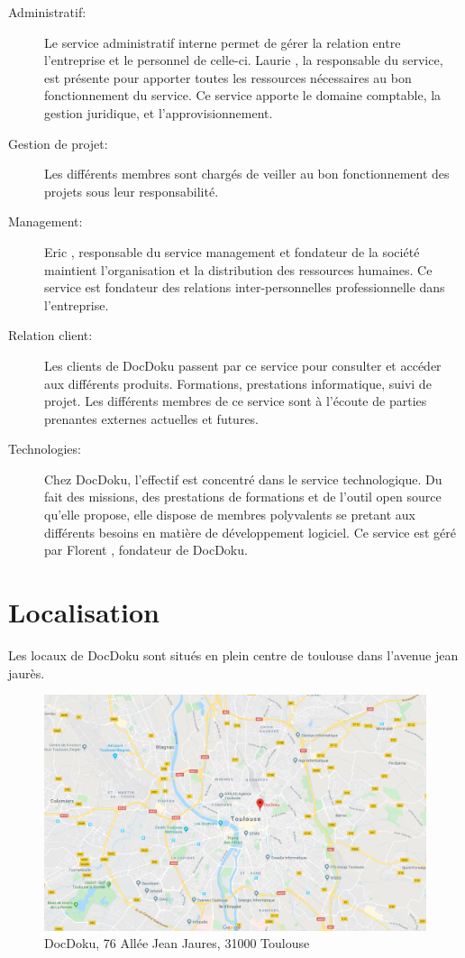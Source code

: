 \documentclass[11pt]{report}
\begin{document}
			\begin{description}
				\item[Administratif: ]Le service administratif interne permet de gérer la relation entre l'entreprise et le personnel de celle-ci. 
			Laurie , la responsable du service, est présente pour apporter toutes les ressources nécessaires au bon fonctionnement du service. Ce service apporte le domaine comptable, la gestion juridique, et l'approvisionnement. 
				\item[Gestion de projet: ] Les différents membres sont chargés de veiller au bon fonctionnement des projets sous leur responsabilité.
				\item[Management: ] Eric , responsable du service management et fondateur de la société maintient l'organisation et la distribution des ressources humaines. Ce service est fondateur des relations inter-personnelles professionnelle dans l'entreprise. 
				\item[Relation client: ] Les clients de DocDoku passent par ce service pour consulter et accéder aux différents produits. Formations, prestations informatique, suivi de projet. Les différents membres de ce service sont à l'écoute de parties prenantes externes actuelles et futures.
				\item[Technologies: ] Chez DocDoku, l'effectif est concentré dans le service technologique. Du fait des missions, des prestations de formations et de l'outil open source qu'elle propose, elle dispose de membres polyvalents se pretant aux différents besoins en matière de développement logiciel. Ce service est géré par Florent , fondateur de DocDoku.
			\end{description}

		\newpage

		\section{Localisation}

			Les locaux de DocDoku sont situés en plein centre de toulouse dans l'avenue jean jaurès.

				\begin{figure}[!htb]
					\center
					\includegraphics[scale=0.3]{local.png}
					\caption{DocDoku, 76 Allée Jean Jaures, 31000 Toulouse}
				\end{figure}
\end{document}
